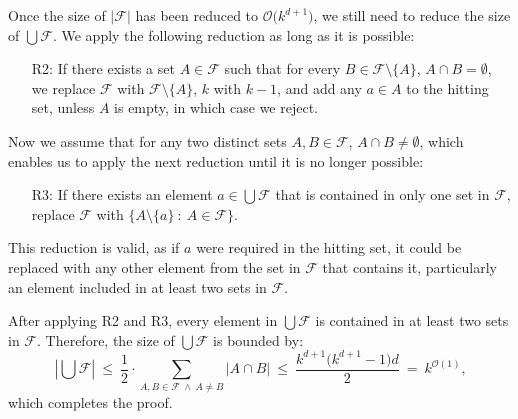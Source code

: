 \documentclass[12pt]{article}
\begin{document}
	Once the size of \(|\mathcal{F}|\) has been reduced to
	\(\mathcal{O}\big(k^{d + 1}\big)\), we still need to reduce the size of
	\(\bigcup \mathcal{F}\). We apply the following reduction as long as it is
	possible:
	\begin{itemize}
		\item[R2:] If there exists a set \(A \in \mathcal{F}\) such that for
		           every \(B \in \mathcal{F} \setminus \{A\}\), \(A \cap B =
		           \emptyset\), we replace \(\mathcal{F}\) with \(\mathcal{F}
		           \setminus \{A\}\), \(k\) with \(k - 1\), and add any \(a \in
		           A\) to the hitting set, unless \(A\) is empty, in which case
		           we reject.
	\end{itemize}
	Now we assume that for any two distinct sets \(A, B \in \mathcal{F}\), \(A
	\cap B \neq \emptyset\), which enables us to apply the next reduction until
	it is no longer possible:
	\begin{itemize}
		\item[R3:] If there exists an element \(a \in \bigcup \mathcal{F}\) that
		           is contained in only one set in \(\mathcal{F}\), replace
		           \(\mathcal{F}\) with \(\{A \setminus \{a\} \ : \ A \in
		           \mathcal{F}\}\).
	\end{itemize}
	This reduction is valid, as if \(a\) were required in the hitting set, it
	could be replaced with any other element from the set in \(\mathcal{F}\)
	that contains it, particularly an element included in at least two sets in
	\(\mathcal{F}\).
	
	\medskip
	
	After applying R2 and R3, every element in \(\bigcup \mathcal{F}\) is
	contained in at least two sets in \(\mathcal{F}\). Therefore, the size of
	\(\bigcup \mathcal{F}\) is bounded by:
	\[ \left| \bigcup \mathcal{F} \right| \ \leqslant \ \frac{1}{2} \cdot
	\sum\limits_{A, B \in \mathcal{F} \ \wedge \ A \neq B} |A \cap B| \
	\leqslant \ \frac{k^{d + 1} \big(k^{d + 1} - 1\big)d}{2} \ = \
	k^{\mathcal{O}(1)} \text{,} \]
	which completes the proof.
\end{document}
